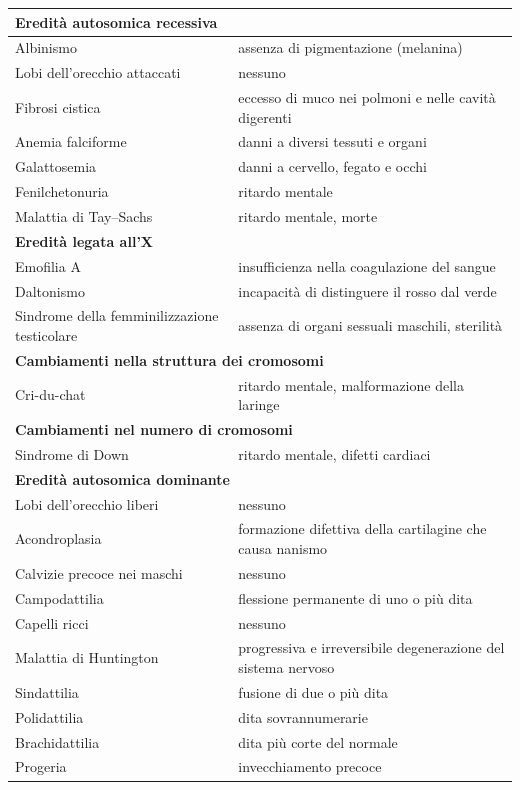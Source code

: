 \begin{table}[htbp]
  \centering
  \small
  \renewcommand{\arraystretch}{1.2}
  \begin{tabularx}{\textwidth}{|X|X|}
    \hline
    \multicolumn{2}{|l|}{\textbf{Eredità autosomica recessiva}} \\
    \hline
    Albinismo & assenza di pigmentazione (melanina) \\
    \hline
    Lobi dell'orecchio attaccati & nessuno \\
    \hline
    Fibrosi cistica & eccesso di muco nei polmoni e nelle cavità digerenti \\
    \hline
    Anemia falciforme & danni a diversi tessuti e organi \\
    \hline
    Galattosemia & danni a cervello, fegato e occhi \\
    \hline
    Fenilchetonuria & ritardo mentale \\
    \hline
    Malattia di Tay--Sachs & ritardo mentale, morte \\
    \hline
    \multicolumn{2}{|l|}{\textbf{Eredità legata all'X}} \\
    \hline
    Emofilia A & insufficienza nella coagulazione del sangue \\
    \hline
    Daltonismo & incapacità di distinguere il rosso dal verde \\
    \hline
    Sindrome della femminilizzazione testicolare & assenza di organi sessuali maschili, sterilità \\
    \hline
    \multicolumn{2}{|l|}{\textbf{Cambiamenti nella struttura dei cromosomi}} \\
    \hline
    Cri-du-chat & ritardo mentale, malformazione della laringe \\
    \hline
    \multicolumn{2}{|l|}{\textbf{Cambiamenti nel numero di cromosomi}} \\
    \hline
    Sindrome di Down & ritardo mentale, difetti cardiaci \\
    \hline
    \multicolumn{2}{|l|}{\textbf{Eredità autosomica dominante}} \\
    \hline
    Lobi dell'orecchio liberi & nessuno \\
    \hline
    Acondroplasia & formazione difettiva della cartilagine che causa nanismo \\
    \hline
    Calvizie precoce nei maschi & nessuno \\
    \hline
    Campodattilia & flessione permanente di uno o più dita \\
    \hline
    Capelli ricci & nessuno \\
    \hline
    Malattia di Huntington & progressiva e irreversibile degenerazione del sistema nervoso \\
    \hline
    Sindattilia & fusione di due o più dita \\
    \hline
    Polidattilia & dita sovrannumerarie \\
    \hline
    Brachidattilia & dita più corte del normale \\
    \hline
    Progeria & invecchiamento precoce \\
    \hline
  \end{tabularx}
\end{table}

